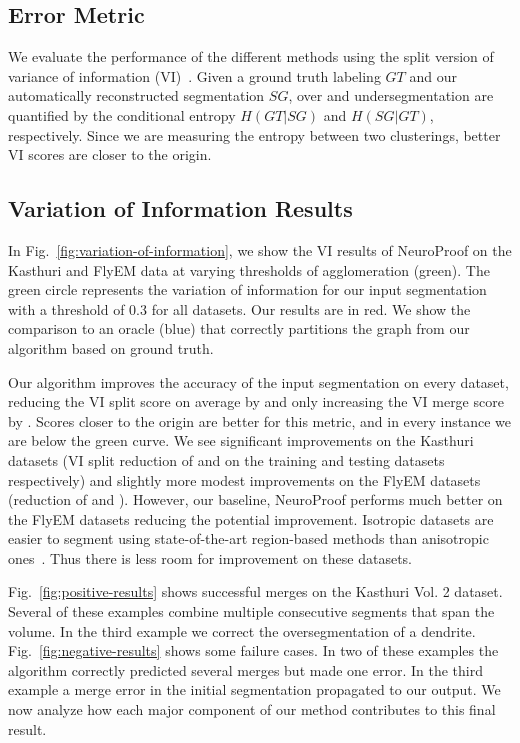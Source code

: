 
\subsection{Error Metric}
\label{sec:variation-of-information}

We evaluate the performance of the different methods using the split version of variance of information (VI)~\cite{meila2003comparing}.
Given a ground truth labeling $GT$ and our automatically reconstructed segmentation $SG$, over and undersegmentation are quantified by the conditional entropy $H(GT | SG)$ and $H(SG | GT)$, respectively. Since we are measuring the entropy between two clusterings, better VI scores are closer to the origin.

\subsection{Variation of Information Results}

In Fig.~\ref{fig:variation-of-information}, we show the VI results of NeuroProof on the Kasthuri and FlyEM data at varying thresholds of agglomeration (green).
The green circle represents the variation of information for our input segmentation with a threshold of 0.3 for all datasets.
Our results are in red.
We show the comparison to an oracle (blue) that correctly partitions the graph from our algorithm based on ground truth.

Our algorithm improves the accuracy of the input segmentation on every dataset, reducing the VI split score on average by  and only increasing the VI merge score by .
Scores closer to the origin are better for this metric, and in every instance we are below the green curve.
We see significant improvements on the Kasthuri datasets (VI split reduction of  and  on the training and testing datasets respectively) and slightly more modest improvements on the FlyEM datasets (reduction of  and ).
However, our baseline, NeuroProof performs much better on the FlyEM datasets reducing the potential improvement.
Isotropic datasets are easier to segment using state-of-the-art region-based methods than anisotropic ones~\cite{plaza2014annotating}.
Thus there is less room for improvement on these datasets.

Fig.~\ref{fig:positive-results} shows successful merges on the Kasthuri Vol. 2 dataset.
Several of these examples combine multiple consecutive segments that span the volume.
In the third example we correct the oversegmentation of a dendrite.
Fig.~\ref{fig:negative-results} shows some failure cases.
In two of these examples the algorithm correctly predicted several merges but made one error.
In the third example a merge error in the initial segmentation propagated to our output.
We now analyze how each major component of our method contributes to this final result.

